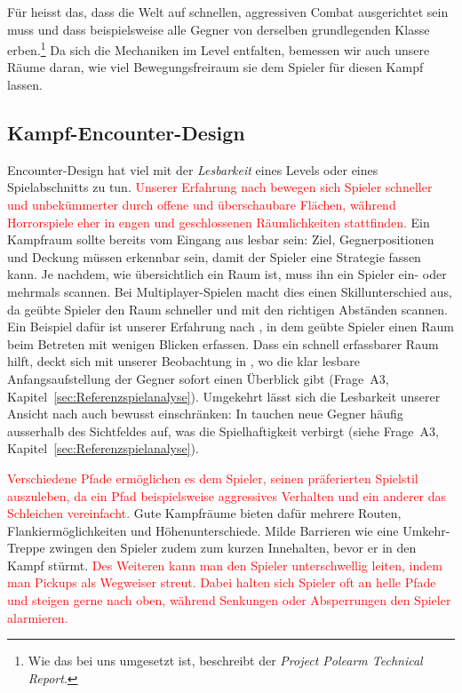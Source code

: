 \documentclass[../Main.tex]{subfiles}
\begin{document}
Für  heisst das, dass die Welt auf schnellen, aggressiven Combat ausgerichtet sein muss und dass beispielsweise alle Gegner von derselben grundlegenden Klasse erben.\footnote{Wie das bei uns umgesetzt ist, beschreibt der \textit{Project Polearm Technical Report}.} Da sich die Mechaniken im Level entfalten, bemessen wir auch unsere Räume daran, wie viel Bewegungsfreiraum sie dem Spieler für diesen Kampf lassen.

\subsection{Kampf-Encounter-Design} \label{sec:Encounter}
Encounter-Design hat viel mit der \textit{Lesbarkeit} eines Levels oder eines Spielabschnitts zu tun. \textcolor{red}{Unserer Erfahrung nach bewegen sich Spieler schneller und unbekümmerter durch offene und überschaubare Flächen, während Horrorspiele eher in engen und geschlossenen Räumlichkeiten stattfinden.} Ein Kampfraum sollte bereits vom Eingang aus lesbar sein: Ziel, Gegnerpositionen und Deckung müssen erkennbar sein, damit der Spieler eine Strategie fassen kann.\autocite{gdc_horizonquests2018} Je nachdem, wie übersichtlich ein Raum ist, muss ihn ein Spieler ein- oder mehrmals scannen. Bei Multiplayer-Spielen macht dies einen Skillunterschied aus, da geübte Spieler den Raum schneller und mit den richtigen Abständen scannen.\autocite[122--123]{totten2014architectural} Ein Beispiel dafür ist unserer Erfahrung nach ,\autocite{valve_counterstrike_2000} in dem geübte Spieler einen Raum beim Betreten mit wenigen Blicken erfassen. Dass ein schnell erfassbarer Raum hilft, deckt sich mit unserer Beobachtung in , wo die klar lesbare Anfangsaufstellung der Gegner sofort einen Überblick gibt (Frage~A3, Kapitel~\ref{sec:Referenzspielanalyse}). Umgekehrt lässt sich die Lesbarkeit unserer Ansicht nach auch bewusst einschränken: In  tauchen neue Gegner häufig ausserhalb des Sichtfeldes auf, was die Spielhaftigkeit verbirgt (siehe Frage~A3, Kapitel~\ref{sec:Referenzspielanalyse}).

\textcolor{red}{Verschiedene Pfade ermöglichen es dem Spieler, seinen präferierten Spielstil auszuleben, da ein Pfad beispielsweise aggressives Verhalten und ein anderer das Schleichen vereinfacht.\autocite{gdc_tenprinciples2010}} Gute Kampfräume bieten dafür mehrere Routen, Flankiermöglichkeiten und Höhenunterschiede. Milde Barrieren wie eine Umkehr-Treppe zwingen den Spieler zudem zum kurzen Innehalten, bevor er in den Kampf stürmt.\autocite{gdc_horizonquests2018} \textcolor{red}{Des Weiteren kann man den Spieler unterschwellig leiten, indem man Pickups als Wegweiser streut. Dabei halten sich Spieler oft an helle Pfade und steigen gerne nach oben, während Senkungen oder Absperrungen den Spieler alarmieren.\autocite[240, 245, 251]{rogers2014levelup}}
\end{document}
